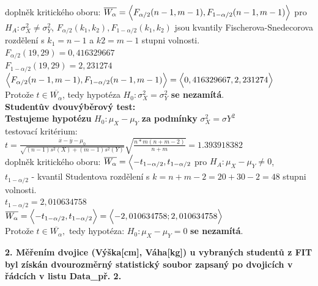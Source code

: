 \documentclass[11pt,a4paper]{article}
\newcommand\ddfrac[2]{\frac{\displaystyle #1}{\displaystyle #2}}
\begin{document}
doplněk kritického oboru: $ \overline{W_\alpha} = \Bigl< F_{\alpha/2} (n - 1, m - 1), F_{1-\alpha/2} (n - 1, m - 1) \Bigr> $ pro $ H_A : \sigma_{X}^2 \ne \sigma_{Y}^2$, $F_{\alpha/2}(k_1, k_2), F_{1-\alpha/2}(k_{1}, k_2) $ jsou kvantily Fischerova-Snedecorova rozdělení s $ k_1 = n - 1 $ a $ k2 = m - 1 $ stupni volnosti. \\

$ F_{\alpha/2}(19, 29) = 0,416329667 $ \\

$ F_{1-\alpha/2}(19, 29) = 2,231274 $ \\

$ \Bigl< F_{\alpha/2} (n - 1, m - 1), F_{1-\alpha/2} (n - 1, m - 1) \Bigr> = \Bigl< 0,416329667, 2,231274 \Bigr> $ \\

Protože $ t \in \overline{W_\alpha}$, tedy hypotéza $ H_0 : \sigma_{X}^2 = \sigma_{Y}^2$ \textbf{se nezamítá}. \\

\vspace{0,7cm}
\textbf{Studentův dvouvýběrový test:} \\
 
\textbf{Testujeme hypotézu} $ H_0 : \mu_X - \mu_Y $ \textbf{za podmínky} $ \sigma_{X}^2 = \sigma{Y}^2 $\\

testovací kritérium: $ t = \ddfrac{\overline{x} - \overline{y} - \mu_0}{\sqrt{(n - 1) s^2(X) + (m - 1) s^2(Y)} } \sqrt{ \ddfrac{n * m(n + m - 2)}{n + m} } = 1.393918382 $ \\

doplněk kritického oboru: $ \overline{W_\alpha} = \Bigl< -t_{1-\alpha/2}, t_{1-\alpha/2} $ pro $ H_A : \mu_X - \mu_Y \ne 0 $, \\

$ t_{1-\alpha/2} $ - kvantil Studentova rozdělení s $ k = n + m - 2 = 20 + 30 - 2 = 48 $ stupni volnosti. \\

$ t_{1-\alpha/2} = 2,010634758 $ \\

$ \overline{W_\alpha} = \Bigl< -t_{1-\alpha/2}, t_{1-\alpha/2} \Bigr> = \Bigl< -2,010634758; 2,010634758 \Bigr> $ \\

Protože $ t \in \overline{W_\alpha} ,$ tedy hypotéza: $ H_0 : \mu_X - \mu_Y = 0 $ \textbf{se nezamítá}.

\newpage


\textbf{2. Měřením dvojice (Výška[cm], Váha[kg]) u vybraných studentů z FIT byl získán dvourozměrný
statistický soubor zapsaný po dvojicích v řádcích v listu Data\_př. 2.}
\end{document}

